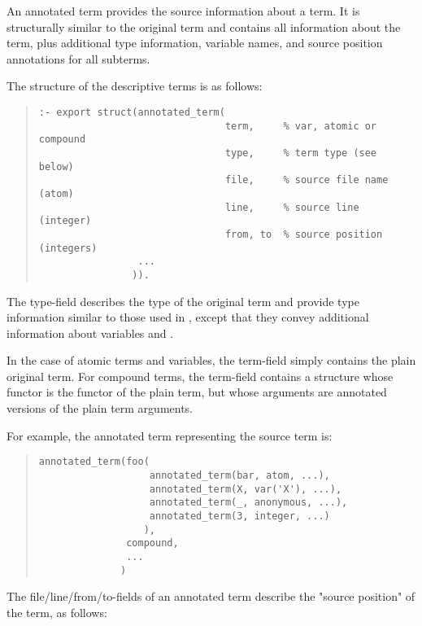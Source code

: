 An annotated term provides the source information about a term. It
is structurally similar to the original term and
contains all information about the term, plus additional type information,
variable names, and source position annotations for all subterms.

The structure of the descriptive terms is as follows:

\vfill %

\begin{quote}
\begin{verbatim}
:- export struct(annotated_term(
                                term,     % var, atomic or compound
                                type,     % term type (see below)
                                file,     % source file name (atom)
                                line,     % source line (integer)
                                from, to  % source position (integers)
                 ...
                )).
\end{verbatim}
\end{quote}

The type-field describes the type of the original term and provide type
information similar to those used in
, except that they
convey additional information about variables and .

In the case of atomic terms and variables, the term-field simply contains the
plain original term. For compound terms, the term-field contains a structure
whose functor is the functor of the plain term, but whose arguments are
annotated versions of the plain term arguments.

For example, the annotated term representing the source term
 is:

\begin{quote}
\begin{verbatim}
annotated_term(foo(
                   annotated_term(bar, atom, ...),
                   annotated_term(X, var('X'), ...),
                   annotated_term(_, anonymous, ...),
                   annotated_term(3, integer, ...)
                  ),
               compound,
               ...
              )
\end{verbatim}
\end{quote}

The file/line/from/to-fields of an annotated term describe the
"source position" of the term, as follows:

